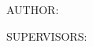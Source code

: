 \vspace*{15mm}

\begin{center}
    AUTHOR:
    \par
    \textbf{{\large \thesisAuthor}}
\end{center}

\begin{center}
    SUPERVISORS:
    \par
    \textbf{{\large \thesisTutor}}
\end{center}

\begin{center}
    \vspace*{1mm}
    {\large \thesisDepartment}\\
    \vspace*{0.5mm}
\end{center}

\newpage
\thispagestyle{empty}
\restoregeometry
